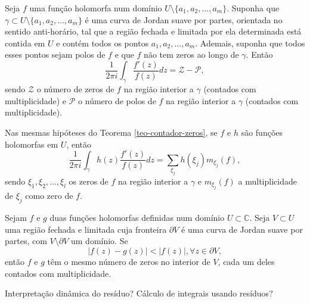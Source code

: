\begin{teorema}
\label{teo-contador-zeros}
Seja $f$ uma função holomorfa num domínio $U\setminus\{ a_1, a_2, \dots, a_m \}$. Suponha que 
$\gamma \subset U\setminus\{ a_1, a_2, \dots, a_m \}$ é uma curva de Jordan suave por partes,
orientada no sentido anti-horário, tal que a região fechada e limitada por ela determinada está
contida em $U$ e contém todos os pontos $ a_1, a_2, \dots, a_m$. Ademais, suponha que todos esses
pontos sejam polos de $f$ e que $f$ não tem zeros ao longo de $\gamma$. Então
\begin{equation*}
    \frac{1}{2\pi i}\int_{\gamma} \frac{f'(z)}{f(z)} dz = \mathcal{Z} - \mathcal{P},
\end{equation*}
sendo $\mathcal{Z}$ o número de zeros de $f$ na região interior a $\gamma$ (contados com multiplicidade)
e $\mathcal{P}$ o número de polos de $f$ na região interior a $\gamma$ (contados com multiplicidade).
\end{teorema}


\begin{corolario}
Nas mesmas hipóteses do Teorema \ref{teo-contador-zeros}, se $f$ e $h$ são funções holomorfas em $U$,
então
\begin{equation*}
    \frac{1}{2\pi i}\int_{\gamma} h(z)\frac{f'(z)}{f(z)} dz = \sum_{\xi_j} h(\xi_j)m_{\xi_j}(f),
\end{equation*}
sendo $\xi_1, \xi_2, \dots, \xi_l$ os zeros de $f$ na região interior a $\gamma$ e $m_{\xi_j}(f)$
a multiplicidade de $\xi_j$ como zero de $f$.
\end{corolario}


\begin{teorema}
\label{teo-rouche}
Sejam $f$ e $g$ duas funções holomorfas definidas num domínio $U\subset\mathbb{C}$. Seja $V\subset U$
uma região fechada e limitada cuja fronteira $\partial V$ é uma curva de Jordan suave por partes, com
$V\setminus\partial V$ um domínio. Se
\begin{equation*}
    |f(z) - g(z)| < |f(z)|, \forall z\in\partial V,
\end{equation*}
então $f$ e $g$ têm o mesmo número de zeros no interior de $V$, cada um deles contados com multiplicidade.
\end{teorema}

Interpretação dinâmica do resíduo?
Cálculo de integrais usando resíduos?